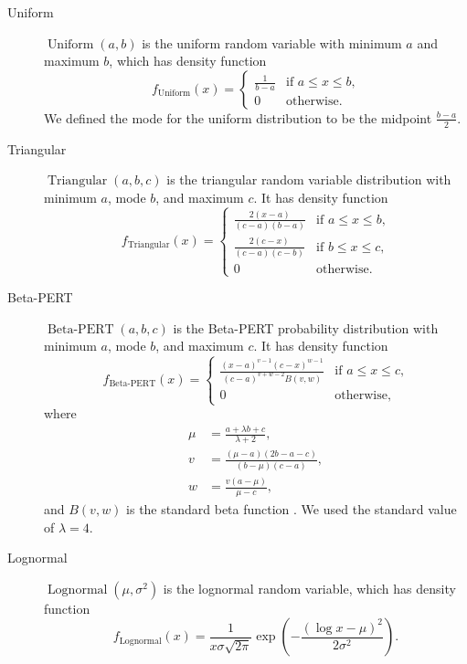 \documentclass{article}
\DeclareMathOperator{\Uniform}{Uniform}
\DeclareMathOperator{\Triangular}{Triangular}
\DeclareMathOperator{\Lognormal}{Lognormal}
\DeclareMathOperator{\BetaPERT}{Beta-PERT}
\begin{document}
\begin{description}
\item[Uniform] $\Uniform(a, b)$ is the uniform random variable with
  minimum $a$ and maximum $b$, which has density function
  \begin{equation}
    \label{uniform}
    f_{\Uniform}(x) =
    \begin{cases}
      \frac{1}{b - a} & \text{if $a \leq x \leq b$,}
      \\
      0 & \text{otherwise.}
    \end{cases}
  \end{equation}
  We defined the mode for the uniform distribution to be the midpoint
  $\frac{b - a}{2}$.

\item [Triangular] $\Triangular(a, b, c)$ is the triangular random
  variable distribution with minimum $a$, mode $b$, and maximum $c$.
  It has density function
  \begin{equation}
    \label{triangular}
    f_{\Triangular}(x) =
    \begin{cases}
      \frac{2 (x - a)}{(c - a)(b - a)} & \text{if $a \leq x \leq b$,}
      \\
      \frac{2 (c - x)}{(c - a)(c - b)} & \text{if $b \leq x \leq c$,}
      \\
      0 & \text{otherwise.}
    \end{cases}
  \end{equation}

\item[Beta-PERT] $\BetaPERT(a, b, c)$ is the Beta-PERT probability
  distribution \cite{malcom1959} with minimum $a$, mode $b$, and
  maximum $c$.  It has density function
  \begin{equation}
    \label{BetaPERT}
    f_{\BetaPERT}(x) =
    \begin{cases}
      \frac{(x - a)^{v - 1} (c - x)^{w - 1}}{(c - a)^{v + w - 2} B(v, w)}
      & \text{if $a \leq x \leq c$,}
      \\
      0 & \text{otherwise,}
    \end{cases}
  \end{equation}
  where
  \begin{equation}
    \begin{split}
      \mu &= \frac{a + \lambda b + c}{\lambda + 2},
      \\
      v &= \frac{(\mu - a)(2 b - a - c)}{(b - \mu) (c - a)},
      \\
      w &= \frac{v (a - \mu)}{\mu - c},
    \end{split}
  \end{equation}
  and $B(v, w)$ is the standard beta function \cite[\S 6.2]{davis1972}.
  We used the standard value of $\lambda = 4$.

\item[Lognormal] $\Lognormal(\mu, \sigma^2)$ is the lognormal random
  variable, which has density function
  \begin{equation}
    f_{\Lognormal}(x) = \frac{1}{x \sigma \sqrt{2 \pi}}
    \exp\left(- \frac{\left(\log x - \mu\right)^2}{2 \sigma^2}\right).
  \end{equation}
\end{description}
\end{document}
